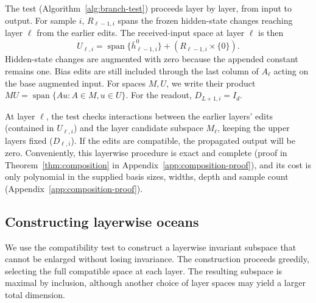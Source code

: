 \documentclass[twoside]{article}
\theoremstyle{remark}
\DeclareMathOperator{\spanop}{span}
\theoremstyle{highlightdefinition}
\theoremstyle{remark}
\newcommand{\spn}{\spanop}
\begin{document}
The test (Algorithm~\ref{alg:branch-test}) proceeds layer by layer, from input to output.
For sample $i$, $R_{\ell-1,i}$ spans the frozen hidden-state changes reaching layer $\ell$ from the earlier edits.
The received-input space at layer $\ell$ is then
\[
 U_{\ell,i}=\spn\{\bar h_{\ell-1,i}^0\}+(R_{\ell-1,i}\times\{0\}).
\]
Hidden-state changes are augmented with zero because the appended constant remains one. Bias edits are still included through the last column of $A_\ell$ acting on the base augmented input. For spaces $M,U$, we write their product $MU=\spn\{Au:A\in M,u\in U\}$. 
For the readout, $D_{L+1,i}=I_d$.

At layer $\ell$, the test checks interactions between the earlier layers' edits (contained in $U_{\ell,i}$) and the layer candidate subspace $M_\ell$, keeping the upper layers fixed ($D_{\ell,i}$). If the edits are compatible, the propagated output will be zero. Conveniently, this layerwise procedure is exact and complete (proof in Theorem~\ref{thm:composition} in Appendix~\ref{app:composition-proof}), and its cost is only polynomial in the supplied basis sizes, widths, depth and sample count (Appendix~\ref{app:composition-proof}).

\subsection{Constructing layerwise oceans}
\label{sec:construction}
We use the compatibility test to construct a layerwise invariant subspace that cannot be enlarged without losing invariance. The construction proceeds greedily, selecting the full compatible space at each layer. The resulting subspace is maximal by inclusion, although another choice of layer spaces may yield a larger total dimension.
\end{document}
